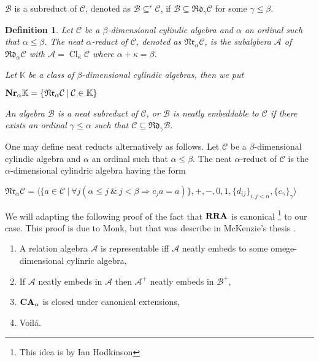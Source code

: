 \documentclass[a4paper]{article}
\theoremstyle{defin}
\newtheorem{defin}{Definition}
\theoremstyle{theorem}
\theoremstyle{prop}
\theoremstyle{lemma}
\theoremstyle{fact}
\theoremstyle{ex}
\theoremstyle{col}
\begin{document}
$\mathcal{B}$ is a subreduct of $\mathcal{C}$, denoted as $\mathcal{B} \subseteq^{r} \mathcal{C}$, if $\mathcal{B} \subseteq \mathfrak{R}\mathfrak{d}_{\gamma}\mathcal{C}$ for some $\gamma \leq \beta$.

\begin{defin}
  Let $\mathcal{C}$ be a $\beta$-dimensional cylindic algebra and $\alpha$ an ordinal such that $\alpha \leq \beta$.
  The neat $\alpha$-reduct of $\mathcal{C}$, denoted as $\mathfrak{N}\mathfrak{r}_\alpha \mathcal{C}$,
  is the subalgbera $\mathcal{A}$ of $\mathfrak{R}\mathfrak{d}_{\alpha}\mathcal{C}$ with $\mathcal{A} = \operatorname{Cl}_{\kappa} \mathcal{C}$ where $\alpha + \kappa = \beta$.

  Let $\mathbb{K}$ be a class of $\beta$-dimensional cylindic algebras, then we put
  \begin{center}
    ${\bf Nr}_{\alpha}\mathbb{K} = \{ \mathfrak{N}\mathfrak{r}_\alpha \mathcal{C} \: | \: \mathcal{C} \in \mathbb{K} \}$
  \end{center}

  An algebra $\mathcal{B}$ is a neat subreduct of $\mathcal{C}$, or $\mathcal{B}$ is neatly embeddable to $\mathcal{C}$ if there exists an ordinal $\gamma \leq \alpha$ such that
  $\mathcal{C} \subseteq \mathfrak{R}\mathfrak{d}_{\gamma}\mathcal{B}$.
\end{defin}

One may define neat reducts alternatively as follows.
Let $\mathcal{C}$ be a $\beta$-dimensional cylindic algebra and $\alpha$ an ordinal such that $\alpha \leq \beta$. The neat $\alpha$-reduct of $\mathcal{C}$ is the $\alpha$-dimensional cylindric algebra having the form

\begin{center}
  $\mathfrak{N}\mathfrak{r}_\alpha \mathcal{C} = \langle \{ a \in \mathcal{C} \: | \: \forall j (\alpha \leq j \: \& \: j < \beta \Rightarrow c_j a = a) \}, +, -, 0, 1, \{d_{ij}\}_{i,j < \alpha}, \{c_{\gamma}\}_{\gamma} \rangle$
\end{center}

We will adapting the following proof of the fact that ${\bf RRA}$ is canonical \footnote{This idea is by Ian Hodkinson} to our case. This proof is due to Monk, but that was describe in McKenzie's thesis \cite{mckenzie1968representation}.

\begin{enumerate}
  \item A relation algebra $\mathcal{A}$ is representable iff $\mathcal{A}$ neatly embeds to some omege-dimensional cylinric algebra,
  \item If $\mathcal{A}$ neatly embeds in $\mathcal{A}$ then $\mathcal{A}^{+}$ neatly embeds in $\mathcal{B}^{+}$,
  \item ${\bf CA}_{\alpha}$ is closed under canonical extensions,
  \item Voil\'{a}.
\end{enumerate}
\end{document}
